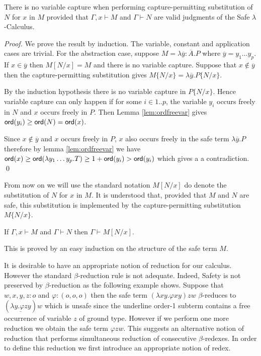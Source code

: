 \documentclass{llncs}
\newcommand\subst[2]{\left[ #1/#2 \right]}
\newcommand\captsubst[2]{\{#1/#2 \}}
\newcommand\ord[1]{{\sf ord}(#1)}
\begin{document}
\begin{lemma}
\label{lem:homog_nocapture} There is
no variable capture when performing capture-permitting
substitution of $N$ for $x$ in $M$
provided that $\Gamma, x \vdash M$ and $\Gamma \vdash  N$ are valid judgments of the Safe $\lambda$-Calculus.
\end{lemma}

\begin{proof}
We prove the result by induction. The variable, constant and
application cases are trivial. For the abstraction case, suppose $M
= \lambda \overline{y} : \overline{A}. P$ where $\overline{y} = y_1
\ldots y_p$. If $x \in \overline{y}$ then $M \subst{N}{x} = M$ and there is no variable capture.
Suppose that $x \not\in \overline{y}$ then the capture-permitting substitution gives 
$M \captsubst{N}{x} = \lambda \overline{y} . P \captsubst{N}{x}$.

By the induction hypothesis there is no variable capture in $P \captsubst{N}{x}$.
Hence variable capture can only happen if for some $i \in 1..p$, the variable $y_i$
occurs freely in $N$ and $x$ occurs freely in $P$. Then Lemma \ref{lem:ordfreevar} gives
$ \ord{y_i} \geq \ord{N} = \ord{x}$.

Since $x \not \in \overline{y}$ and $x$ occurs freely in $P$, $x$ also occurs freely in the safe term
$\lambda \overline{y}. P$ therefore by lemma \ref{lem:ordfreevar} we have
$ \ord{x} \geq \ord{\lambda y_1 \ldots y_p . T} \geq 1+ \ord{y_i} > \ord{y_i}$
which gives a a contradiction. \qed
\end{proof}

From now on we will use the standard notation $M\subst{N}{x}$ do denote the substitution of $N$ for $x$ in $M$.
It is understood that, provided that $M$ and $N$ are safe, this substitution
is implemented by the capture-permitting substitution $M\captsubst{N}{x}$.


\begin{lemma}
\label{lem:subst_preserve_safety}
If $\Gamma, x \vdash M$ and $\Gamma \vdash N$ then $\Gamma \vdash M[N/x]$.
\end{lemma}
This is proved by an easy induction on the structure of the safe term $M$.


It is desirable to have an appropriate notion of reduction for our calculus. However the standard $\beta$-reduction rule is not adequate. Indeed, Safety is not preserved by $\beta$-reduction as the following example shows. Suppose that $w,x,y,z : o$ and $\varphi : (o,o,o)$ then the safe term $(\lambda x y . \varphi x y) z w$ $\beta$-reduces to $(\underline{\lambda y . \varphi z y}) w$ which is unsafe since the underline order-1 subterm  contains a free occurrence of variable $z$ of ground type. However if we perform one more reduction we obtain the safe term
$\varphi z w$. This suggests an alternative notion of reduction that performs simultaneous reduction of consecutive $\beta$-redexes. In order to define this reduction we first introduce an appropriate notion of redex.
\end{document}
